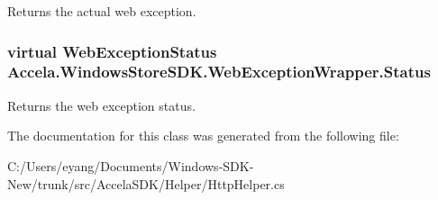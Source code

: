 Returns the actual web exception. 

\hypertarget{class_accela_1_1_windows_store_s_d_k_1_1_web_exception_wrapper_a9d16702f6a5d92c66cd47a963965b618}{
\subsubsection[{Status}]{\setlength{\rightskip}{0pt plus 5cm}virtual Web\+Exception\+Status Accela.\+Windows\+Store\+S\+D\+K.\+Web\+Exception\+Wrapper.\+Status\hspace{0.3cm}{\ttfamily [get]}}}\label{class_accela_1_1_windows_store_s_d_k_1_1_web_exception_wrapper_a9d16702f6a5d92c66cd47a963965b618}


Returns the web exception status. 



The documentation for this class was generated from the following file\+:\begin{DoxyCompactItemize}
\item 
C\+:/\+Users/eyang/\+Documents/\+Windows-\/\+S\+D\+K-\/\+New/trunk/src/\+Accela\+S\+D\+K/\+Helper/Http\+Helper.\+cs\end{DoxyCompactItemize}
